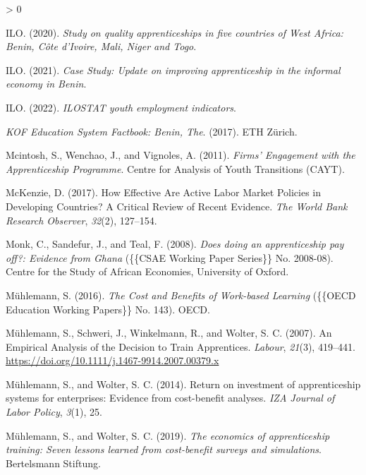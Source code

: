 \documentclass[
  11pt,
a4paper
]{article}
\newlength{\cslhangindent}
\newenvironment{CSLReferences}[2] %
 {%
  \setlength{\parindent}{0pt}
  \ifodd #1 \everypar{\setlength{\hangindent}{\cslhangindent}}\ignorespaces\fi
  \ifnum #2 > 0
  \setlength{\parskip}{#2\baselineskip}
  \fi
 }%
 {}
\begin{document}
\begin{CSLReferences}{1}{0}
\leavevmode\hypertarget{ref-ilo2020a}{}%
ILO. (2020). \emph{Study on quality apprenticeships in five countries of {West Africa}: {Benin}, {Côte} d'{Ivoire}, {Mali}, {Niger} and {Togo}}.

\leavevmode\hypertarget{ref-ilo2021}{}%
ILO. (2021). \emph{Case {Study}: {Update} on improving apprenticeship in the informal economy in {Benin}}.

\leavevmode\hypertarget{ref-ilo2022}{}%
ILO. (2022). \emph{{ILOSTAT} youth employment indicators}.

\leavevmode\hypertarget{ref-kof2017}{}%
\emph{{KOF Education System Factbook}: {Benin}, {The}}. (2017). {ETH Zürich}.

\leavevmode\hypertarget{ref-mcintosh2011}{}%
Mcintosh, S., Wenchao, J., and Vignoles, A. (2011). \emph{Firms' {Engagement} with the {Apprenticeship Programme}}. {Centre for Analysis of Youth Transitions (CAYT)}.

\leavevmode\hypertarget{ref-mckenzie2017}{}%
McKenzie, D. (2017). How {Effective Are Active Labor Market Policies} in {Developing Countries}? {A Critical Review} of {Recent Evidence}. \emph{The World Bank Research Observer}, \emph{32}(2), 127--154.

\leavevmode\hypertarget{ref-monk2008}{}%
Monk, C., Sandefur, J., and Teal, F. (2008). \emph{Does doing an apprenticeship pay off?: Evidence from {Ghana}} (\{\{CSAE Working Paper Series\}\} No. 2008-08). {Centre for the Study of African Economies, University of Oxford}.

\leavevmode\hypertarget{ref-muhlemann2016}{}%
Mühlemann, S. (2016). \emph{The {Cost} and {Benefits} of {Work-based Learning}} (\{\{OECD Education Working Papers\}\} No. 143). {OECD}.

\leavevmode\hypertarget{ref-muhlemann2007}{}%
Mühlemann, S., Schweri, J., Winkelmann, R., and Wolter, S. C. (2007). An {Empirical Analysis} of the {Decision} to {Train Apprentices}. \emph{Labour}, \emph{21}(3), 419--441. \url{https://doi.org/10.1111/j.1467-9914.2007.00379.x}

\leavevmode\hypertarget{ref-muhlemann2014}{}%
Mühlemann, S., and Wolter, S. C. (2014). Return on investment of apprenticeship systems for enterprises: {Evidence} from cost-benefit analyses. \emph{IZA Journal of Labor Policy}, \emph{3}(1), 25.

\leavevmode\hypertarget{ref-muhlemann2019}{}%
Mühlemann, S., and Wolter, S. C. (2019). \emph{The economics of apprenticeship training: {Seven} lessons learned from cost-benefit surveys and simulations}. {Bertelsmann Stiftung}.


\end{CSLReferences}
\end{document}
